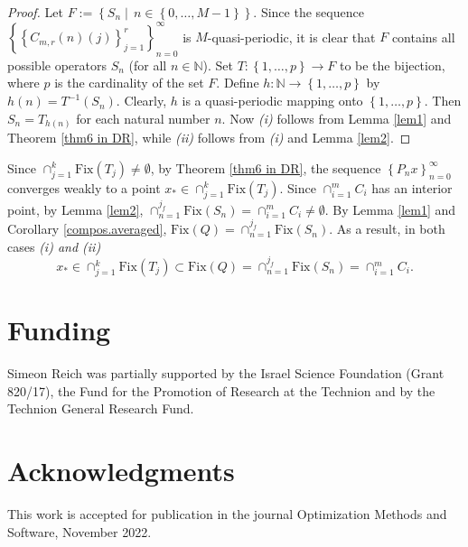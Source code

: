 \documentclass[]{interact}
\theoremstyle{plain}%
\theoremstyle{definition}
\theoremstyle{remark}
\begin{document}
\begin{proof}
Let $F:=\left\{ S_{n}\mid \,n\in\left\{ 0,\dots,M-1\right\} \right\} $.
Since the sequence\\
 $\left\{ \left\{ C_{m,r}\left(n\right)\left(j\right)\right\} _{j=1}^{r}\right\} _{n=0}^{\infty}$
is $M$-quasi-periodic, it is clear that $F$ contains all possible
operators $S_{n}$ \color{black}(for all $n\in\mathbb{N}$)\color{black}. Set $T:\left\{ 1,\dots,p\right\} \rightarrow F$
to be the bijection, where $p$ is the cardinality of the set $F$.
Define $h:\mathbb{N}\rightarrow\left\{ 1,\dots,p\right\} $ by $h\left(n\right)=T^{-1}\left(S_{n}\right)$.
Clearly, $h$ is a quasi-periodic mapping onto $\left\{ 1,\dots,p\right\} $.
Then $S_{n}=T_{h\left(n\right)}$ for each natural number $n$. Now
\textit{(i)} follows from Lemma \ref{lem1} and Theorem \ref{thm6 in DR},
while \textit{(ii)} follows from \textit{(i)} and Lemma \ref{lem2}.
\end{proof}
\makeatletter \renewenvironment{proof}[1][\proofname\space of Theorem \ref{thm3}] {\par\pushQED{\qed}\normalfont\topsep6\p@\@plus6\p@\relax\trivlist\item[\hskip\labelsep\bfseries#1\@addpunct{.}]\ignorespaces}{\popQED\endtrivlist\@endpefalse} \makeatother
\begin{proof}
 \color{black}Since $\cap_{j=1}^{k}\mathrm{Fix}(T_{j})\not=\emptyset$, by Theorem \ref{thm6 in DR}, the sequence $\left\{ P_{n}x\right\} _{n=0}^{\infty}$ converges weakly to a point $x_{*}\in\cap_{j=1}^{k}\mathrm{Fix}(T_{j})$. Since $\cap_{i=1}^{m}C_{i}$ has an interior point, by Lemma \ref{lem2}, $\cap_{n=1}^{j_{f}}\mathrm{Fix}(S_{n})=\cap_{i=1}^{m}C_{i}\not=\emptyset$. By Lemma \ref{lem1} and Corollary \ref{compos.averaged}, $\mathrm{Fix}(Q)=\cap_{n=1}^{j_{f}}\mathrm{Fix}(S_{n})$. As a result, in both cases \it{(i)} and \it{(ii)}
\[
x_{*}\in\cap_{j=1}^{k}\mathrm{Fix}(T_{j})\subset\mathrm{Fix}(Q)=\cap_{n=1}^{j_{f}}\mathrm{Fix}(S_{n})=\cap_{i=1}^{m}C_{i}.
\]
 \end{proof}
 \color{black}

\section*{Funding}
Simeon Reich was partially supported by the Israel Science Foundation (Grant 820/17), the Fund for the Promotion of Research at the Technion
and by the Technion General Research Fund.

\section*{Acknowledgments}
This work is accepted for publication in the journal Optimization Methods and Software, November 2022.
\end{document}
